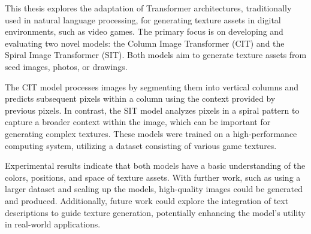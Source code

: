 This thesis explores the adaptation of Transformer architectures, traditionally used in natural language processing, for generating texture assets in digital environments, such as video games. The primary focus is on developing and evaluating two novel models: the Column Image Transformer (CIT) and the Spiral Image Transformer (SIT). Both models aim to generate texture assets from seed images, photos, or drawings.

The CIT model processes images by segmenting them into vertical columns and predicts subsequent pixels within a column using the context provided by previous pixels. In contrast, the SIT model analyzes pixels in a spiral pattern to capture a broader context within the image, which can be important for generating complex textures. These models were trained on a high-performance computing system, utilizing a dataset consisting of various game textures.

Experimental results indicate that both models have a basic understanding of the colors, positions, and space of texture assets. With further work, such as using a larger dataset and scaling up the models, high-quality images could be generated and produced. Additionally, future work could explore the integration of text descriptions to guide texture generation, potentially enhancing the model's utility in real-world applications.